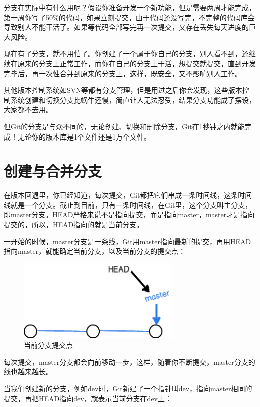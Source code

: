 分支在实际中有什么用呢？假设你准备开发一个新功能，但是需要两周才能完成，第一周你写了50\%的代码，如果立刻提交，由于代码还没写完，不完整的代码库会导致别人不能干活了。如果等代码全部写完再一次提交，又存在丢失每天进度的巨大风险。

现在有了分支，就不用怕了。你创建了一个属于你自己的分支，别人看不到，还继续在原来的分支上正常工作，而你在自己的分支上干活，想提交就提交，直到开发完毕后，再一次性合并到原来的分支上，这样，既安全，又不影响别人工作。

其他版本控制系统如SVN等都有分支管理，但是用过之后你会发现，这些版本控制系统创建和切换分支比蜗牛还慢，简直让人无法忍受，结果分支功能成了摆设，大家都不去用。

但Git的分支是与众不同的，无论创建、切换和删除分支，Git在1秒钟之内就能完成！无论你的版本库是1个文件还是1万个文件。

\section{创建与合并分支}
在版本回退里，你已经知道，每次提交，Git都把它们串成一条时间线，这条时间线就是一个分支。截止到目前，只有一条时间线，在Git里，这个分支叫主分支，即master分支。HEAD严格来说不是指向提交，而是指向master，master才是指向提交的，所以，HEAD指向的就是当前分支。

一开始的时候，master分支是一条线，Git用master指向最新的提交，再用HEAD指向master，就能确定当前分支，以及当前分支的提交点：


\begin{figure}[h]
  \centering
  \includegraphics[width=0.7\textwidth]{img/git-br-initial.png}
  \caption{当前分支提交点}
  \label{fig:git-br-initial}
\end{figure}

每次提交，master分支都会向前移动一步，这样，随着你不断提交，master分支的线也越来越长。

当我们创建新的分支，例如dev时，Git新建了一个指针叫dev，指向master相同的提交，再把HEAD指向dev，就表示当前分支在dev上：



